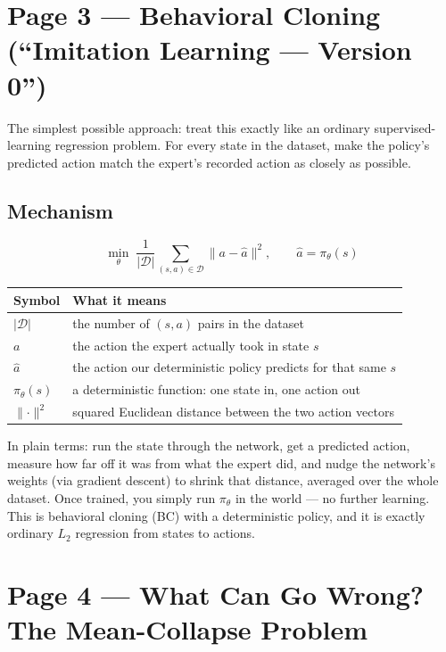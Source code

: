 \documentclass[11pt]{article}
\begin{document}
\section*{Page 3 --- Behavioral Cloning (``Imitation Learning --- Version 0'')}

The simplest possible approach: treat this exactly like an ordinary supervised-learning regression problem. For every state in the dataset, make the policy's predicted action match the expert's recorded action as closely as possible.

\subsection*{Mechanism}

\[
\min_\theta \; \frac{1}{|\mathcal{D}|} \sum_{(s,a) \in \mathcal{D}} \lVert a - \hat a \rVert^2, \qquad \hat a = \pi_\theta(s)
\]

\begin{center}
\begin{tabular}{@{}ll@{}}
\toprule
Symbol & What it means \\
\midrule
$|\mathcal{D}|$ & the number of $(s,a)$ pairs in the dataset \\
$a$ & the action the expert actually took in state $s$ \\
$\hat a$ & the action our deterministic policy predicts for that same $s$ \\
$\pi_\theta(s)$ & a deterministic function: one state in, one action out \\
$\lVert \cdot \rVert^2$ & squared Euclidean distance between the two action vectors \\
\bottomrule
\end{tabular}
\end{center}

In plain terms: run the state through the network, get a predicted action, measure how far off it was from what the expert did, and nudge the network's weights (via gradient descent) to shrink that distance, averaged over the whole dataset. Once trained, you simply run $\pi_\theta$ in the world --- no further learning. This is behavioral cloning (BC) with a deterministic policy, and it is exactly ordinary $L_2$ regression from states to actions.

\section*{Page 4 --- What Can Go Wrong? The Mean-Collapse Problem}
\end{document}
